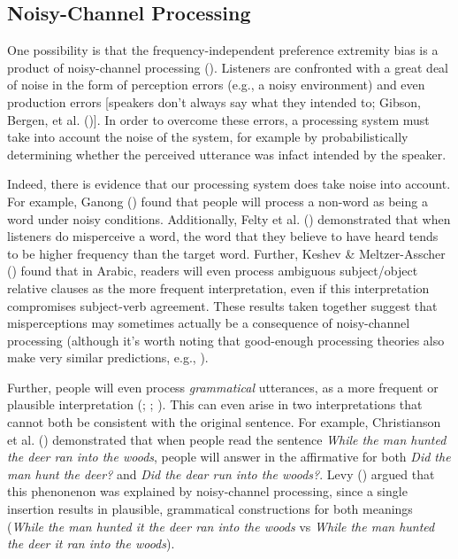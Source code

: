 \documentclass[
  12pt,
  letterpaper,
]{scrreprt}
\begin{document}
\subsection{Noisy-Channel Processing}\label{noisy-channel-processing}

One possibility is that the frequency-independent preference extremity
bias is a product of noisy-channel processing
(). Listeners are confronted with a great deal of noise in the
form of perception errors (e.g., a noisy environment) and even
production errors {[}speakers don't always say what they intended to;
Gibson, Bergen, et al.
(){]}. In order
to overcome these errors, a processing system must take into account the
noise of the system, for example by probabilistically determining
whether the perceived utterance was infact intended by the speaker.

Indeed, there is evidence that our processing system does take noise
into account. For example, Ganong
() found
that people will process a non-word as being a word under noisy
conditions. Additionally, Felty et al.
() demonstrated that
when listeners do misperceive a word, the word that they believe to have
heard tends to be higher frequency than the target word. Further, Keshev
\& Meltzer-Asscher ()
found that in Arabic, readers will even process ambiguous subject/object
relative clauses as the more frequent interpretation, even if this
interpretation compromises subject-verb agreement. These results taken
together suggest that misperceptions may sometimes actually be a
consequence of noisy-channel processing (although it's worth noting that
good-enough processing theories also make very similar predictions,
e.g., ).

Further, people will even process \emph{grammatical} utterances, as a
more frequent or plausible interpretation
(; ;
). This can even arise in two interpretations that cannot
both be consistent with the original sentence. For example, Christianson
et al. ()
demonstrated that when people read the sentence
\emph{While the man hunted the deer ran into the woods}, people will
answer in the affirmative for both \emph{Did the man hunt the deer?} and
\emph{Did the dear run into the woods?}. Levy
() argued that this
phenonenon was explained by noisy-channel processing, since a single
insertion results in plausible, grammatical constructions for both
meanings (\emph{While the man hunted it the deer ran into the woods} vs
\emph{While the man hunted the deer it ran into the woods}).
\end{document}
